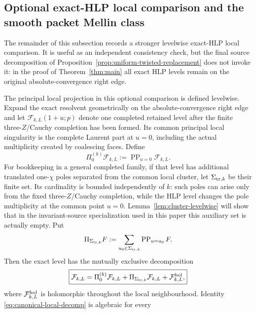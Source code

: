 \subsection{Optional exact-HLP local comparison and the smooth packet Mellin class}
\label{sec:local-projector}

The remainder of this subsection records a stronger levelwise exact-HLP local
comparison.  It is useful as an independent consistency check, but the final
source decomposition of Proposition~\ref{prop:uniform-twisted-replacement}
does not invoke it: in the proof of Theorem~\ref{thm:main} all exact HLP levels
remain on the original absolute-convergence right edge.

The principal local projection in this optional comparison is defined levelwise. Expand the exact
resolvent geometrically on the absolute-convergence right edge and let
$\mathcal F_{k,L}(1+u;p)$ denote one completed retained level after the finite
three-$Z$/Cauchy completion has been formed. Its common principal local singularity is the complete Laurent part at
$u=0$, including the actual multiplicity created by coalescing faces. Define
\begin{equation}
\Pi_0^{(k)}\mathcal F_{k,L}
:=\operatorname{PP}_{u=0}\mathcal F_{k,L}.
\label{eq:levelwise-PP-projector}
\end{equation}
For bookkeeping in a general completed family, if that level has additional
translated one-$\chi$ poles separated from the common local cluster, let
$\Sigma_{{\rm tr},k}$ be their finite set. Its cardinality is bounded
independently of $k$: such poles can arise only from the fixed three-$Z$/Cauchy
completion, while the HLP level changes the pole multiplicity at the common
point $u=0$.  Lemma~\ref{lem:cluster-levelwise} will show that in the
invariant-source specialization used in this paper this auxiliary set is
actually empty. Put
\begin{equation}
\Pi_{\Sigma_{{\rm tr},k}}F
:=\sum_{u_0\in\Sigma_{{\rm tr},k}}
\operatorname{PP}_{u=u_0}F.
\label{eq:local-PP-projector}
\end{equation}
Then the exact level has the mutually exclusive decomposition
\begin{equation}
\boxed{
\mathcal F_{k,L}
=\Pi_0^{(k)}\mathcal F_{k,L}
+\Pi_{\Sigma_{{\rm tr},k}}\mathcal F_{k,L}
+\mathcal F_{k,L}^{\rm hol},
}
\label{eq:canonical-local-decomp}
\end{equation}
where $\mathcal F_{k,L}^{\rm hol}$ is holomorphic throughout the local
neighbourhood. Identity \eqref{eq:canonical-local-decomp} is algebraic for every
